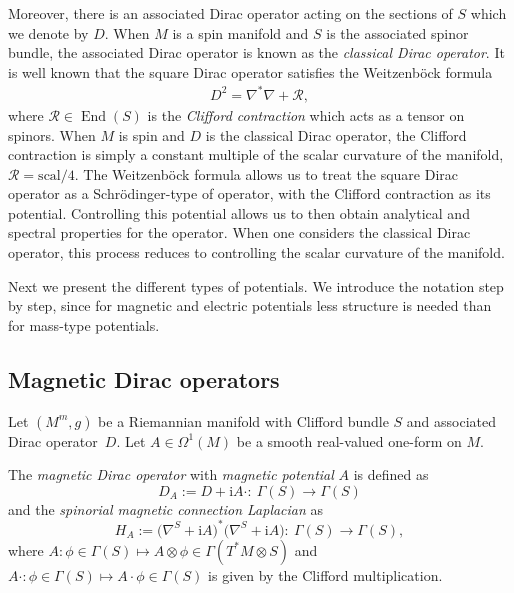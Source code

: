 \documentclass[pdftex]{sigma}
\numberwithin{equation}{section}
\begin{document}
Moreover, there is an associated Dirac operator acting on the sections of $S$ which we denote by $D$. When $M$ is a spin manifold and $S$ is the associated spinor bundle, the associated Dirac operator is known as the \emph{classical Dirac operator}. It is well known that the square Dirac operator satisfies the Weitzenb\"ock formula
\begin{align*}%
D^2=\nabla^*\nabla +\mathcal{R},
\end{align*}
where $\mathcal{R}\in \operatorname{End}(S)$ is the \emph{Clifford contraction} which acts as a tensor on spinors. When $M$ is spin and $D$ is the classical Dirac operator, the Clifford contraction is simply a constant multiple of the scalar curvature of the manifold, $\mathcal{R}=\mathrm{scal}/4$. The Weitzenb\"ock formula allows us to treat the square Dirac operator as a Schr\"odinger-type of operator, with the Clifford contraction as its potential. Controlling this potential allows us to then obtain analytical and spectral properties for the operator. When one considers the classical Dirac operator, this process reduces to controlling the scalar curvature of the manifold.

Next we present the different types of potentials. We introduce the notation step by step, since for magnetic and electric potentials less structure is needed than for mass-type potentials.

\subsection{Magnetic Dirac operators}
Let $(M^m,g)$ be a Riemannian manifold with Clifford bundle $S$ and associated Dirac operator~$D$. Let $A\in \Omega^1(M)$ be a smooth real-valued one-form on $M$.

The \emph{magnetic Dirac operator} with \emph{magnetic potential} $A$ is defined as
\[ D_{A}:= D+ {\mathrm{i}}A\cdot \colon \ \Gamma(S)\to \Gamma(S) \]
and the \emph{spinorial magnetic connection Laplacian} as
\[ H_{A} := \bigl(\nabla^S + {\mathrm{i}}A\bigr)^*\bigl(\nabla^S + {\mathrm{i}}A \bigr) \colon \ \Gamma(S)\to \Gamma(S),\]
where $A\colon \phi\in \Gamma(S)\mapsto A\otimes \phi \in \Gamma(T^*M\otimes S)$ and $A\cdot \colon \phi \in \Gamma(S) \mapsto A\cdot \phi \in \Gamma(S)$ is given by the Clifford multiplication.
\end{document}
